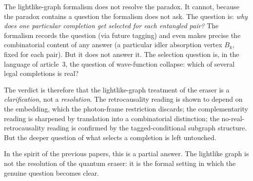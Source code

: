 \documentclass[11pt]{article}
\begin{document}
The lightlike-graph formalism does not resolve the paradox. It cannot, because the paradox contains a question the formalism does not ask. The question is: \emph{why does one particular completion get selected for each entangled pair?} The formalism records the question (via future tagging) and even makes precise the combinatorial content of any answer (a particular idler absorption vertex $B_k$, fixed for each pair). But it does not answer it. The selection question is, in the language of article~3, the question of wave-function collapse: which of several legal completions is real?

The verdict is therefore that the lightlike-graph treatment of the eraser is a \emph{clarification}, not a \emph{resolution}. The retrocausality reading is shown to depend on the embedding, which the photon-frame restriction discards; the complementarity reading is sharpened by translation into a combinatorial distinction; the no-real-retrocausality reading is confirmed by the tagged-conditional subgraph structure. But the deeper question of what selects a completion is left untouched.

In the spirit of the previous papers, this is a partial answer. The lightlike graph is not the resolution of the quantum eraser: it is the formal setting in which the genuine question becomes clear.
\end{document}
